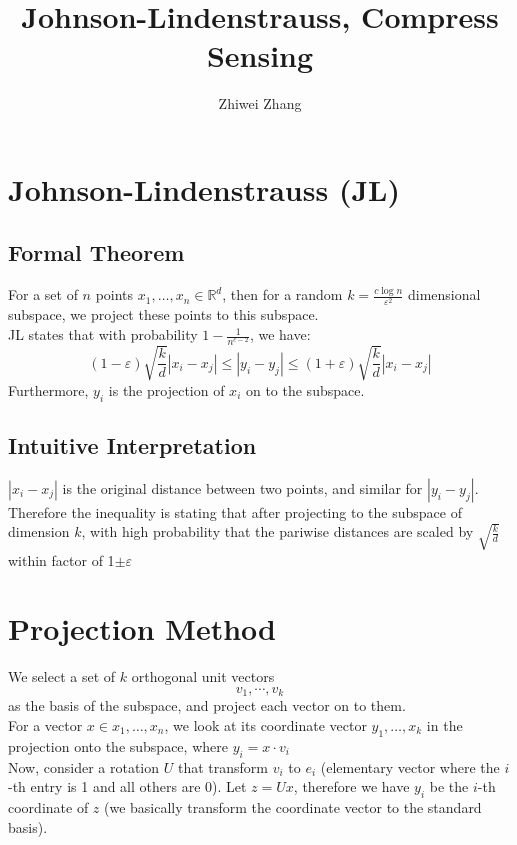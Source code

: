 \documentclass[12pt]{article}
\begin{document}
 
 
 
\title{Johnson-Lindenstrauss, Compress Sensing}
\author{Zhiwei Zhang}
 
\maketitle

\section{Johnson-Lindenstrauss (JL)}
\subsection{Formal Theorem}
For a set of $n$ points $x _ { 1 } , \ldots , x _ { n } \in \mathbb { R } ^ { d }$, then for a random $k = \frac { c \log n } { \varepsilon ^ { 2 } }$ dimensional subspace, we project these points to this subspace. \\
\newline 
JL states that with probability $1 - \frac { 1 } { n ^ { c - 2 } }$, we have:
$$
( 1 - \varepsilon ) \sqrt { \frac { k } { d } } \left| x _ { i } - x _ { j } \right| \leq \left| y _ { i } - y _ { j } \right| \leq ( 1 + \varepsilon ) \sqrt { \frac { k } { d } } \left| x _ { i } - x _ { j } \right|
$$
Furthermore, $y_i$ is the projection of $x_i$ on to the subspace.
\subsection{Intuitive Interpretation}
$|x_i - x_j|$ is the original distance between two points, and similar for  $|y_i - y_j|$. Therefore the inequality is stating that after projecting to the subspace of dimension $k$, with high probability that the pariwise distances are scaled by $\sqrt{\frac{k}{d}}$ within factor of 1$\pm \varepsilon$

\section{Projection Method}
We select a set of $k$ orthogonal unit vectors $$v_1, \cdots, v_k$$ as the basis of the subspace, and project each vector on to them. \\
\newline
For a vector $x \in x _ { 1 } , \ldots , x _ { n }$, we look at its coordinate vector $y _ { 1 } , \ldots , x _ { k }$ in the projection onto the subspace, where $y_i = x \cdot v_i$\\
\newline
Now, consider a rotation $U$ that transform $v_i$ to $e_i$ (elementary vector where the $i$-th entry is 1 and all others are 0). Let $z = Ux$, therefore we have $y_i$ be the $i$-th coordinate of $z$ (we basically transform the coordinate vector to the standard basis).
\end{document}
